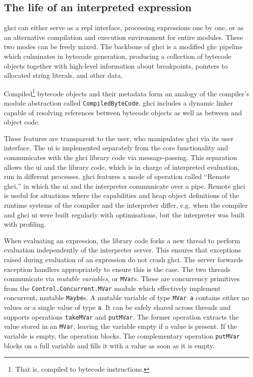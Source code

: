 \documentclass[thesis=B,english]{FITthesis}[2019/12/23]
\newcommand{\hsType}[1]{\texttt{#1}}
\newcommand{\hsIdent}[1]{\texttt{#1}}
\newcommand{\hsModule}[1]{\texttt{#1}}
\begin{document}
\subsection*{The life of an interpreted expression}
\acrshort{ghci} can either serve as a \acrshort{repl} interface, processing
expressions one by one, or as an alternative compilation and execution
environment for entire modules. These two modes can be freely mixed. The
backbone of \acrshort{ghci} is a modified \acrshort{ghc} pipeline which
culminates in bytecode generation, producing a collection of bytecode objects
together with high-level information about breakpoints, pointers to allocated
string literals, and other data.

Compiled\footnote{That is, compiled to bytecode instructions.} bytecode objects
and their metadata form an analogy of the compiler's module abstraction called
\hsType{CompiledByteCode}. \acrshort{ghci} includes a dynamic linker capable of
resolving references between bytecode objects as well as between
 and object code.

These features are transparent to the user, who manipulates \acrshort{ghci} via
its user interface. The \acrshort{ui} is implemented separately from the core
functionality and communicates with the \acrshort{ghci} library code via
message-passing. This separation allows the \acrshort{ui} and the library code,
which is in charge of interpreted evaluation, run in different processes.
\acrshort{ghci} features a mode of operation called ``Remote \acrshort{ghci},''
in which the \acrshort{ui} and the interpreter communicate over a pipe. Remote
\acrshort{ghci} is useful for situations where the capabilities and heap object
definitions of the runtime systems of the compiler and the interpreter differ,
e.g. when the compiler and \acrshort{ghci} \acrshort{ui} were built regularly
with optimisations, but the interpreter was built with profiling.

When evaluating an expression, the library code forks a new thread to perform
evaluation independently of the interpreter server. This ensures that
exceptions raised during evaluation of an expression do not crash
\acrshort{ghci}. The server forwards exception handlers appropriately to ensure
this is the case. The two threads communicate via \textit{mutable variables},
or \hsType{MVar}s. These are concurrency primitives from the
\hsModule{Control.Concurrent.MVar} module which effectively implement
concurrent, mutable \hsType{Maybe}s\cite{concurrent-haskell}. A mutable
variable of type \hsType{MVar a} contains either no values or a single value of
type \hsType{a}. It can be safely shared across threads and supports
operations \hsIdent{takeMVar} and \hsIdent{putMVar}. The former operation
extracts the value stored in an \hsType{MVar}, leaving the variable empty if a
value is present. If the variable is empty, the operation blocks. The
complementary operation \hsIdent{putMVar} blocks on a full variable and fills
it with a value as soon as it is empty.
\end{document}
